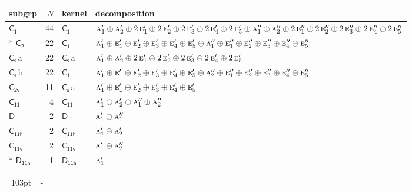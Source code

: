 \documentclass[10pt,a4paper]{article}
\newcommand{\needspace}[1]{\par\penalty-100\begingroup\dimen0=#1\relax\dimen2=\pagegoal
  \advance\dimen2-\pagetotal\ifdim\dimen0>\dimen2\relax\ifdim\dimen2>0pt\vfil\break\fi\fi
  \endgroup}
\numberwithin{equation}{section}
\newcommand{\grp}[1]{\mathsf{#1}}
\newcommand{\irr}[1]{\text{\normalfont\scshape #1}}
\newcommand{\clsletter}[1]{\,{\scriptsize\color{black!55}#1}}
\newlength{\fillwidth}\newlength{\cellwidth}\newlength{\colwidth}
\begin{document}
{\begin{longtable}{@{}lrl>{\RaggedRight\arraybackslash}p{\fillwidth}@{}}
subgrp & $N$ & kernel & decomposition\\\midrule\endhead
\bottomrule\endfoot\endlastfoot
\href{C1.pdf}{$\grp{C_{1}}$} & 44 & \href{C1.pdf}{$\grp{C_{1}}$} & $\irr{a}_{1}'\oplus \irr{a}_{2}'\oplus 2\,\irr{e}_{1}'\oplus 2\,\irr{e}_{2}'\oplus 2\,\irr{e}_{3}'\oplus 2\,\irr{e}_{4}'\oplus 2\,\irr{e}_{5}'\oplus \irr{a}_{1}''\oplus \irr{a}_{2}''\oplus 2\,\irr{e}_{1}''\oplus 2\,\irr{e}_{2}''\oplus 2\,\irr{e}_{3}''\oplus 2\,\irr{e}_{4}''\oplus 2\,\irr{e}_{5}''$\\*
\href{C2.pdf}{$\grp{C_{2}}$} & 22 & \href{C1.pdf}{$\grp{C_{1}}$} & $\irr{a}_{1}'\oplus \irr{e}_{1}'\oplus \irr{e}_{2}'\oplus \irr{e}_{3}'\oplus \irr{e}_{4}'\oplus \irr{e}_{5}'\oplus \irr{a}_{1}''\oplus \irr{e}_{1}''\oplus \irr{e}_{2}''\oplus \irr{e}_{3}''\oplus \irr{e}_{4}''\oplus \irr{e}_{5}''$\\
\href{C1v.pdf}{$\grp{C_{s}}$}\clsletter{a} & 22 & \href{C1v.pdf}{$\grp{C_{s}}$}\clsletter{a} & $\irr{a}_{1}'\oplus \irr{a}_{2}'\oplus 2\,\irr{e}_{1}'\oplus 2\,\irr{e}_{2}'\oplus 2\,\irr{e}_{3}'\oplus 2\,\irr{e}_{4}'\oplus 2\,\irr{e}_{5}'$\\
\href{C1v.pdf}{$\grp{C_{s}}$}\clsletter{b} & 22 & \href{C1.pdf}{$\grp{C_{1}}$} & $\irr{a}_{1}'\oplus \irr{e}_{1}'\oplus \irr{e}_{2}'\oplus \irr{e}_{3}'\oplus \irr{e}_{4}'\oplus \irr{e}_{5}'\oplus \irr{a}_{2}''\oplus \irr{e}_{1}''\oplus \irr{e}_{2}''\oplus \irr{e}_{3}''\oplus \irr{e}_{4}''\oplus \irr{e}_{5}''$\\
\href{C2v.pdf}{$\grp{C_{2v}}$} & 11 & \href{C1v.pdf}{$\grp{C_{s}}$}\clsletter{a} & $\irr{a}_{1}'\oplus \irr{e}_{1}'\oplus \irr{e}_{2}'\oplus \irr{e}_{3}'\oplus \irr{e}_{4}'\oplus \irr{e}_{5}'$\\
\href{C11.pdf}{$\grp{C_{11}}$} & 4 & \href{C11.pdf}{$\grp{C_{11}}$} & $\irr{a}_{1}'\oplus \irr{a}_{2}'\oplus \irr{a}_{1}''\oplus \irr{a}_{2}''$\\
\href{D11.pdf}{$\grp{D_{11}}$} & 2 & \href{D11.pdf}{$\grp{D_{11}}$} & $\irr{a}_{1}'\oplus \irr{a}_{1}''$\\
\href{C11h.pdf}{$\grp{C_{11h}}$} & 2 & \href{C11h.pdf}{$\grp{C_{11h}}$} & $\irr{a}_{1}'\oplus \irr{a}_{2}'$\\
\href{C11v.pdf}{$\grp{C_{11v}}$} & 2 & \href{C11v.pdf}{$\grp{C_{11v}}$} & $\irr{a}_{1}'\oplus \irr{a}_{2}''$\\*
\href{D11h.pdf}{$\grp{D_{11h}}$} & 1 & \href{D11h.pdf}{$\grp{D_{11h}}$} & $\irr{a}_{1}'$\\
\bottomrule\end{longtable}}
\needspace{103pt}
\end{document}
